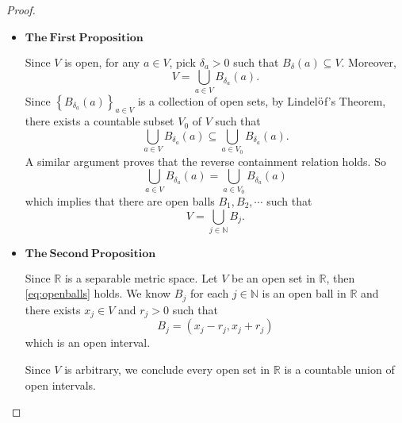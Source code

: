 \begin{Exercise}
\begin{proof}
\begin{itemize}
\item $\mathbf{The\ First\ Proposition}$

Since $V$ is open, for any $a\in V$, pick $\delta_a>0$ such that $B_{\delta}(a) \subseteq V$. Moreover,
$$
V = \bigcup_{a\in V} B_{\delta_a}(a).
$$
Since $\left\{B_{\delta_a}(a)\right\}_{a\in V}$ is a collection of open sets, by Lindel$\ddot{\rm o}$f's Theorem, there exists a countable subset $V_0$ of $V$ such that 
$$
\bigcup_{a\in V} B_{\delta_a}(a)
\subseteq \bigcup_{a\in V_0} B_{\delta_a}(a).
$$
A similar argument proves that the reverse containment relation holds. So
$$
\bigcup_{a\in V} B_{\delta_a}(a)
= \bigcup_{a\in V_0} B_{\delta_a}(a)
$$
which implies that there are open balls $B_1,B_2,\cdots$ such that
\begin{equation}\label{eq:openballs}
V = \bigcup_{j\in\mathbb{N}}B_j.
\end{equation}


\item $\mathbf{The\ Second\ Proposition}$

Since $\mathbb{R}$ is a separable metric space. Let $V$ be an open set in $\mathbb{R}$, then \eqref{eq:openballs} holds. We know $B_j$ for each $j\in\mathbb{N}$ is an open ball in $\mathbb{R}$ and there exists $x_j\in V$ and $r_j>0$ such that
$$
B_j = (x_j-r_j, x_j+r_j)
$$
which is an open interval.

Since $V$ is arbitrary, we conclude every open set in $\mathbb{R}$ is a countable union of open intervals. 
\end{itemize}
\end{proof}
\end{Exercise}
